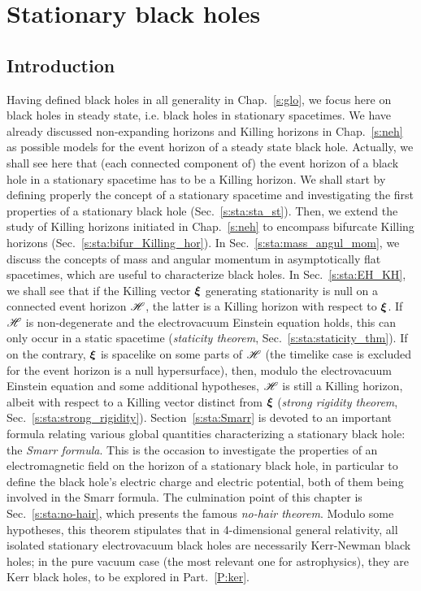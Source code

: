 \chapter{Stationary black holes}
\label{s:sta}

\minitoc

\section{Introduction}

Having defined black holes in all generality in Chap.~\ref{s:glo}, we focus
here on black holes in steady state, i.e. black holes in stationary spacetimes.
We have already discussed
non-expanding horizons and Killing horizons in Chap.~\ref{s:neh} as
possible models for the event horizon of a
steady state black hole. Actually, we shall see here that (each connected
component of) the event horizon of a black hole in a stationary spacetime has to be
a Killing horizon.
We shall start by defining properly the concept of a stationary
spacetime and investigating the first properties of a stationary black hole
(Sec.~\ref{s:sta:sta_st}). Then, we extend the study of Killing horizons
initiated in Chap.~\ref{s:neh} to encompass bifurcate Killing horizons
(Sec.~\ref{s:sta:bifur_Killing_hor}). In Sec.~\ref{s:sta:mass_angul_mom},
we discuss the concepts
of mass and angular momentum in asymptotically flat spacetimes, which are useful to characterize black holes. In Sec.~\ref{s:sta:EH_KH}, we shall
see that
if the Killing vector $\bm{\xi}$ generating stationarity is null on
a connected event horizon $\mathscr{H}$, the latter is a Killing horizon with
respect to $\bm{\xi}$.  If $\mathscr{H}$ is non-degenerate and the
electrovacuum Einstein equation holds, this can only occur in a static spacetime
(\emph{staticity theorem}, Sec.~\ref{s:sta:staticity_thm}).
If on the contrary, $\bm{\xi}$ is spacelike on some parts of $\mathscr{H}$ (the timelike
case is excluded for the event horizon is a null hypersurface), then, modulo the
electrovacuum Einstein equation and some additional hypotheses,
$\mathscr{H}$ is still a Killing horizon, albeit with respect to a Killing vector
distinct from $\bm{\xi}$ (\emph{strong rigidity theorem}, Sec.~\ref{s:sta:strong_rigidity}).
Section~\ref{s:sta:Smarr} is devoted to an important formula relating various global
quantities characterizing a stationary black hole: the \emph{Smarr formula}.
This is the occasion to investigate the properties of an electromagnetic
field on the horizon of a stationary black hole, in particular to define
the black hole's electric charge and electric potential, both of them being involved
in the Smarr formula. The culmination point of this chapter is
Sec.~\ref{s:sta:no-hair}, which presents the famous
\emph{no-hair theorem}. Modulo some hypotheses, this theorem stipulates that in 4-dimensional
general relativity, all isolated stationary electrovacuum black holes are necessarily
Kerr-Newman black holes; in the pure vacuum case (the most relevant one for astrophysics),
they are Kerr black holes, to be explored in Part.~\ref{P:ker}.

